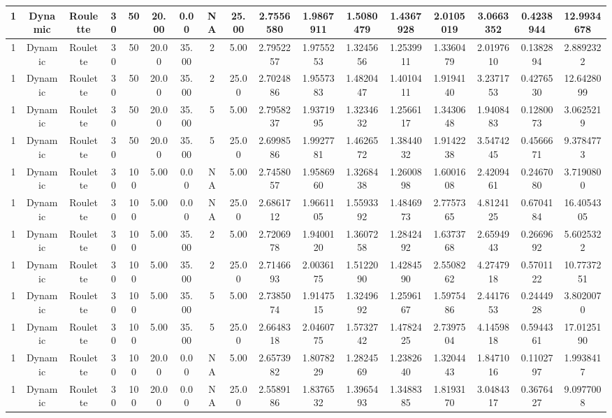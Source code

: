 \begin{longtable}{ | c | c | c | c | c | c | c | c | c | c | c | c | c | c | c | c | c | }
	\hline
	1	&	Dynamic	&	Roulette	&	30	&	50	&	20.00	&	0.00	&	NA	&	25.00	&	2.7556580	&	1.9867911	&	1.5080479	&	1.4367928	&	2.0105019	&	3.0663352	&	0.4238944	&	12.9934678 \\
	\hline
	1	&	Dynamic	&	Roulette	&	30	&	50	&	20.00	&	35.00	&	2	&	5.00	&	2.7952257	&	1.9755253	&	1.3245656	&	1.2539911	&	1.3360479	&	2.0197610	&	0.1382894	&	2.8892322 \\
	\hline
	1	&	Dynamic	&	Roulette	&	30	&	50	&	20.00	&	35.00	&	2	&	25.00	&	2.7024886	&	1.9557383	&	1.4820447	&	1.4010411	&	1.9194140	&	3.2371753	&	0.4276530	&	12.6428099 \\
	\hline
	1	&	Dynamic	&	Roulette	&	30	&	50	&	20.00	&	35.00	&	5	&	5.00	&	2.7958237	&	1.9371995	&	1.3234632	&	1.2566117	&	1.3430648	&	1.9408483	&	0.1280073	&	3.0625219 \\
	\hline
	1	&	Dynamic	&	Roulette	&	30	&	50	&	20.00	&	35.00	&	5	&	25.00	&	2.6998586	&	1.9927781	&	1.4626572	&	1.3844032	&	1.9142238	&	3.5474245	&	0.4566671	&	9.3784773 \\
	\hline
	1	&	Dynamic	&	Roulette	&	30	&	100	&	5.00	&	0.00	&	NA	&	5.00	&	2.7458057	&	1.9586960	&	1.3268438	&	1.2600898	&	1.6001608	&	2.4209461	&	0.2467080	&	3.7190800 \\
	\hline
	1	&	Dynamic	&	Roulette	&	30	&	100	&	5.00	&	0.00	&	NA	&	25.00	&	2.6861712	&	1.9661105	&	1.5593392	&	1.4846973	&	2.7757365	&	4.8124125	&	0.6704184	&	16.4054305 \\
	\hline
	1	&	Dynamic	&	Roulette	&	30	&	100	&	5.00	&	35.00	&	2	&	5.00	&	2.7206978	&	1.9400120	&	1.3607258	&	1.2842492	&	1.6373768	&	2.6594943	&	0.2669692	&	5.6025322 \\
	\hline
	1	&	Dynamic	&	Roulette	&	30	&	100	&	5.00	&	35.00	&	2	&	25.00	&	2.7146693	&	2.0036175	&	1.5122090	&	1.4284590	&	2.5508262	&	4.2747918	&	0.5701122	&	10.7737251 \\
	\hline
	1	&	Dynamic	&	Roulette	&	30	&	100	&	5.00	&	35.00	&	5	&	5.00	&	2.7385074	&	1.9147515	&	1.3249692	&	1.2596167	&	1.5975486	&	2.4417653	&	0.2444928	&	3.8020070 \\
	\hline
	1	&	Dynamic	&	Roulette	&	30	&	100	&	5.00	&	35.00	&	5	&	25.00	&	2.6648318	&	2.0460775	&	1.5732742	&	1.4782425	&	2.7397504	&	4.1459818	&	0.5944361	&	17.0125190 \\
	\hline
	1	&	Dynamic	&	Roulette	&	30	&	100	&	20.00	&	0.00	&	NA	&	5.00	&	2.6573982	&	1.8078229	&	1.2824569	&	1.2382640	&	1.3204443	&	1.8471016	&	0.1102797	&	1.9938417 \\
	\hline
	1	&	Dynamic	&	Roulette	&	30	&	100	&	20.00	&	0.00	&	NA	&	25.00	&	2.5589186	&	1.8376532	&	1.3965493	&	1.3488385	&	1.8193170	&	3.0484317	&	0.3676427	&	9.0977008 \\

\end{longtable}
